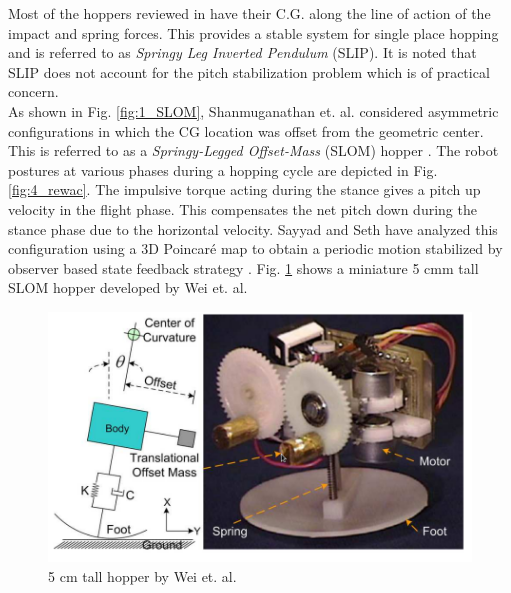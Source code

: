 Most of the hoppers reviewed in \cite{review} have their C.G. along the line of action of the impact and spring forces. This provides
a stable system for single place hopping and is referred to as \emph{Springy Leg Inverted Pendulum} (SLIP). It is noted that SLIP
does not account for the pitch stabilization problem which is of practical concern.\\

As shown in Fig. \ref{fig:1_SLOM}, Shanmuganathan et. al. considered asymmetric configurations in which the CG location was offset 
from the geometric center. This is referred to as a \emph{Springy-Legged Offset-Mass} (SLOM) hopper \cite{shanmug}. The robot 
postures at various phases during a hopping cycle are depicted in Fig. \ref{fig:4_rewac}. The impulsive torque acting during the 
stance gives a pitch up velocity in the flight phase. This compensates the net pitch down during the stance phase due to the 
horizontal velocity. Sayyad and Seth have analyzed this configuration using a 3D Poincar\'e map to obtain a periodic motion 
stabilized by observer based state feedback strategy \cite{sayyad}. Fig. \ref{fig:1_wei} shows a miniature 5 cmm tall SLOM hopper developed by
Wei et. al. \cite{5cmhopper}

\vspace{0.4in}
\begin{figure}[h]
\centering
\includegraphics[scale=1]{fig/wei.pdf}
\caption[5 cm tall hopper by Wei]{5 cm tall hopper by Wei et. al. \cite{5cmhopper}}
\label{fig:1_wei}
\end{figure}

















